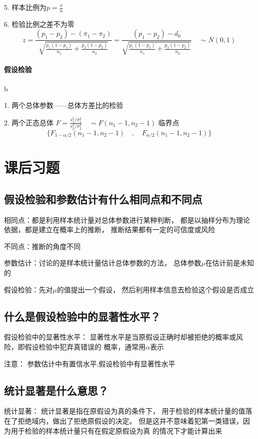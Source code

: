 \documentclass[UTF8,10pt]{book}
\begin{document}
{    5. 样本比例为$p = \frac{x}{n}$ 
    
    6. 检验比例之差不为零	
    $$ z = \frac{(p_1-p_2)-(\pi_1-\pi_2)}{\sqrt{\frac{p_1(1-p_1)}{n_1} + \frac{p_2(1-p_2)}{n_2} }} = \frac{(p_1-p_2)-d_0}{\sqrt{\frac{p_1(1-p_1)}{n_1} + \frac{p_2(1-p_2)}{n_2} }} \quad \sim N(0,1)$$
    
    \paragraph{假设检验} b
    
    1. 两个总体参数——总体方差比的检验 
    
    2. 两个正态总体	
    $F = \frac{s_1^2 / \sigma_1^2}{s_2^2 / \sigma_2^2} \quad \sim F(n_1-1,n_2-1)$ 
    临界点 $$ \{F_{1-\alpha / 2}(n_1-1,n_2-1) \quad , \quad F_{\alpha / 2}(n_1-1,n_2-1) \}$$
    \section{课后习题}
    {\kaishu
    \subsection{假设检验和参数估计有什么相同点和不同点}	
   
    
    相同点：都是利用样本统计量对总体参数进行某种判断，
    都是以抽样分布为理论依据，都是建立在概率上的推断，
    推断结果都有一定的可信度或风险 
    
    不同点：推断的角度不同 
    
    参数估计：讨论的是样本统计量估计总体参数的方法，
    总体参数$\mu$在估计前是未知的 
    
    假设检验：先对$\mu$的值提出一个假设，
    然后利用样本信息去检验这个假设是否成立

    \subsection{什么是假设检验中的显著性水平？}	
    假设检验中的显著性水平： 
    显著性水平是当原假设正确时却被拒绝的概率或风险，即假设检验中犯弃真错误的
    概率，通常用$\alpha$表示 
    
    注意： 参数估计中有置信水平,假设检验中有显著性水平

    \subsection{统计显著是什么意思？}	
    
    统计显著： 统计显著是指在原假设为真的条件下，
    用于检验的样本统计量的值落在了拒绝域内，做出了拒绝原假设的决定。
    但是这并不意味着犯第一类错误，因为用于检验的样本统计量只有在假定原假设为真
    的情况下才能计算出来

}}
\end{document}
